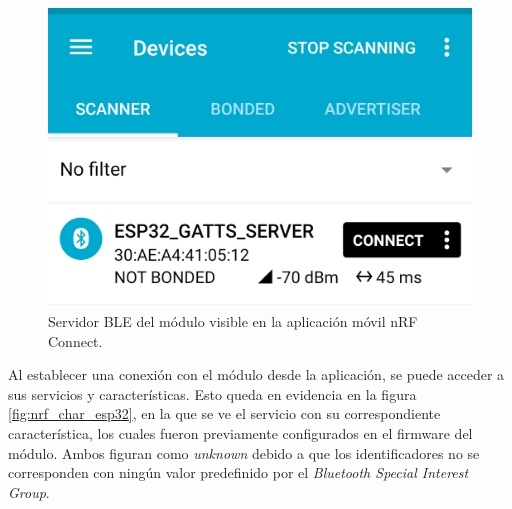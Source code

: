 \begin{figure}[h]
\centering
\includegraphics[scale=0.16]{./Figures/nrf_discover_esp32.png}
\caption{Servidor BLE del módulo visible en la aplicación móvil nRF Connect.}
\label{fig:nrf_discover_esp32}
\end{figure}

Al establecer una conexión con el módulo desde la aplicación, se puede acceder a sus servicios y características. Esto queda en evidencia en la figura \ref{fig:nrf_char_esp32}, en la que se ve el servicio con su correspondiente característica, los cuales fueron previamente configurados en el firmware del módulo. Ambos figuran como \emph{unknown} debido a que los identificadores no se corresponden con ningún valor predefinido por el \emph{Bluetooth Special Interest Group}.

